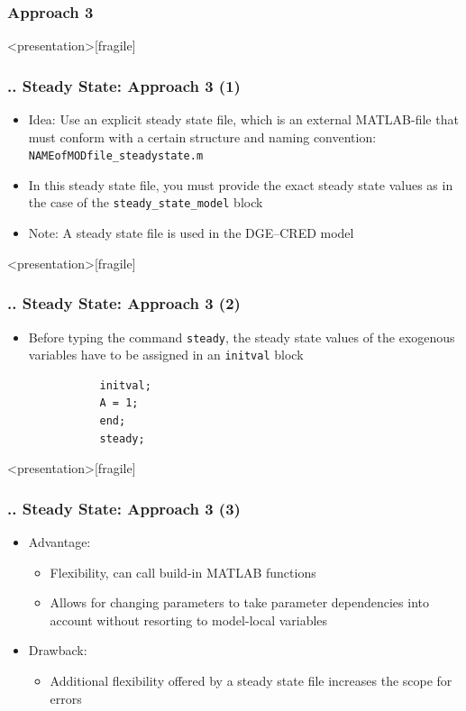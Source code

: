 \documentclass[11pt,aspectratio=169]{beamer}
\begin{document}
\subsubsection{Approach 3}
\begin{frame}<presentation>[fragile]
	\frametitle{{\thesection.\thesubsection.\thesubsubsection} Steady State: Approach 3 (1)}
	\begin{itemize}
		\item Idea: Use an explicit steady state file, which is an external MATLAB-file that must conform with a certain structure and naming convention:\\ \texttt{NAMEofMODfile\_steadystate.m}
		\item In this steady state file, you must provide the exact steady state values as in the case of the \texttt{steady\_state\_model} block
		\item Note: A steady state file is used in the DGE--CRED model
	\end{itemize}
\end{frame}
\begin{frame}<presentation>[fragile]
	\frametitle{{\thesection.\thesubsection.\thesubsubsection} Steady State: Approach 3 (2)}
	\begin{itemize}
		\item Before typing the command \texttt{steady}, the steady state values of the exogenous variables have to be assigned in an \texttt{initval} block
		\begin{verbatim}
		   initval;
		   A = 1;
		   end;		
		   steady;
		\end{verbatim}
	\end{itemize}
\end{frame}
\begin{frame}<presentation>[fragile]
	\frametitle{{\thesection.\thesubsection.\thesubsubsection} Steady State: Approach 3 (3)}
	\begin{itemize}
		\item Advantage: 
		\begin{itemize}
			\item Flexibility, can call build-in MATLAB functions
			\item Allows for changing parameters to take parameter dependencies into account without resorting to model-local variables
		\end{itemize}
		\item Drawback: 
		\begin{itemize}
			\item Additional flexibility offered by a steady state file increases the scope for errors
		\end{itemize} 
	\end{itemize}
\end{frame}
\end{document}
